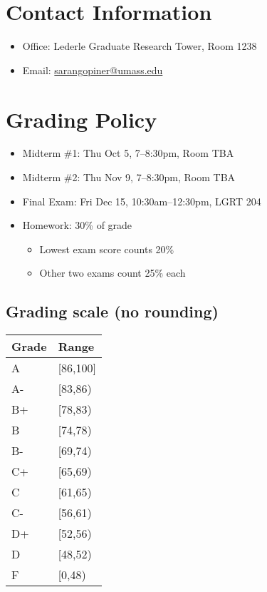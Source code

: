 \documentclass[11pt]{article}
\begin{document}
\section{Contact Information}
\label{sec:org5013f8b}
\begin{itemize}
\item Office: Lederle Graduate Research Tower, Room 1238
\item Email: \href{mailto:sarangopiner@umass.edu}{sarangopiner@umass.edu}
\end{itemize}

\section{Grading Policy}
\label{sec:org9533d7f}
\begin{itemize}
\item Midterm \#1: Thu Oct 5, 7--8:30pm, Room TBA
\item Midterm \#2: Thu Nov 9, 7--8:30pm, Room TBA
\item Final Exam: Fri Dec 15, 10:30am--12:30pm, LGRT 204
\item Homework: 30\% of grade
\begin{itemize}
\item Lowest exam score counts 20\%
\item Other two exams count 25\% each
\end{itemize}
\end{itemize}

\subsection{Grading scale (no rounding)}
\label{sec:orga5ccb5a}

\begin{center}
\begin{tabular}{ll}
\hline
Grade & Range\\[0pt]
\hline
A & [86,100]\\[0pt]
A- & [83,86)\\[0pt]
B+ & [78,83)\\[0pt]
B & [74,78)\\[0pt]
B- & [69,74)\\[0pt]
C+ & [65,69)\\[0pt]
C & [61,65)\\[0pt]
C- & [56,61)\\[0pt]
D+ & [52,56)\\[0pt]
D & [48,52)\\[0pt]
F & [0,48)\\[0pt]
\hline
\end{tabular}
\end{center}
\end{document}
